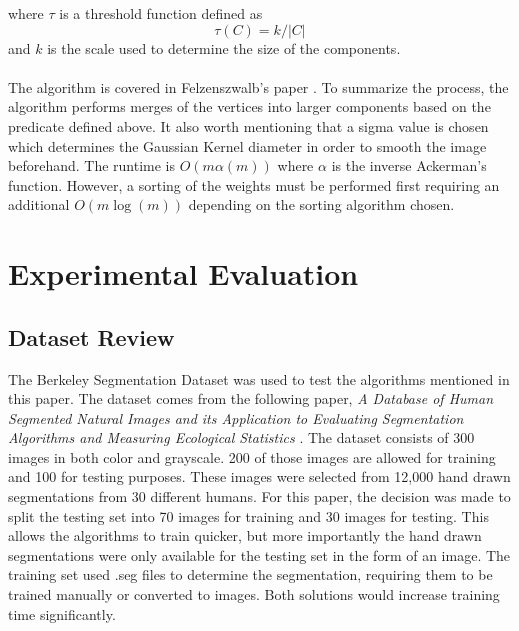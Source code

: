 \documentclass[12pt]{extarticle}
\begin{document}
    where $\tau$ is a threshold function defined as
    \begin{equation}
      \tau(C)=k/|C|
    \end{equation}
    and $k$ is the scale used to determine the size of the components.
    \\
    \\
    The algorithm is covered in Felzenszwalb's paper \cite{felzen}.
    To summarize the process, the algorithm performs merges of the vertices
    into larger components based on the predicate defined above. It also worth
    mentioning that a sigma value is chosen which determines the Gaussian 
    Kernel diameter in order to smooth the image beforehand. The runtime 
    is $O(m\alpha(m))$ where $\alpha$ is the inverse Ackerman's function.
    However, a sorting of the weights must be performed first requiring an
    additional $O(m \log(m))$ depending on the sorting algorithm chosen.


\section{Experimental Evaluation}

  \subsection{Dataset Review}
    The Berkeley Segmentation Dataset \cite{dataset} was used to test
    the algorithms mentioned in this paper. The dataset comes from the
    following paper, \emph{A Database of Human Segmented Natural Images
    and its Application to Evaluating Segmentation Algorithms and
    Measuring Ecological Statistics} \cite{MartinFTM01}.
    The dataset consists of 300 images in both color and grayscale.
    200 of those images are allowed for training and 100 for testing purposes.
    These images were selected from 12,000 hand drawn segmentations from 30
    different humans. For this paper, the decision was made to split the
    testing set into 70 images for training and 30 images for testing. This
    allows the algorithms to train quicker, but more importantly the hand
    drawn segmentations were only available for the testing set in the form
    of an image. The training set used .seg files to determine the segmentation,
    requiring them to be trained manually or converted to images. Both solutions
    would increase training time significantly.
\end{document}
